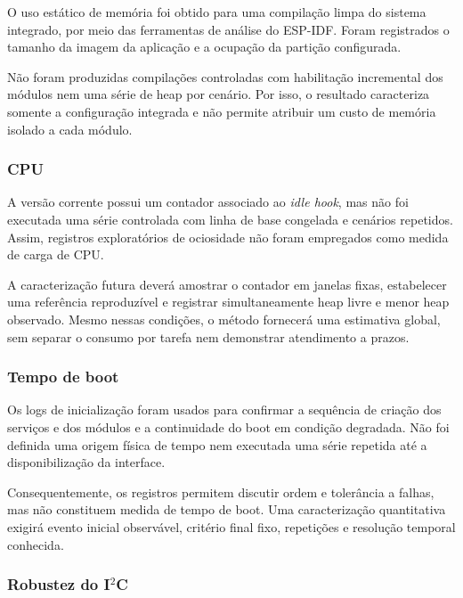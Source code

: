 \documentclass[a4paper,12pt]{article}
\begin{document}
O uso est\'atico de mem\'oria foi obtido para uma compila\c{c}\~ao limpa do sistema integrado, por meio das ferramentas de an\'alise do ESP-IDF. Foram registrados o tamanho da imagem da aplica\c{c}\~ao e a ocupa\c{c}\~ao da parti\c{c}\~ao configurada.


N\~ao foram produzidas compila\c{c}\~oes controladas com habilita\c{c}\~ao incremental dos m\'odulos nem uma s\'erie de heap por cen\'ario. Por isso, o resultado caracteriza somente a configura\c{c}\~ao integrada e n\~ao permite atribuir um custo de mem\'oria isolado a cada m\'odulo.


\subsubsection{CPU}

A vers\~ao corrente possui um contador associado ao \emph{idle hook}, mas n\~ao foi executada uma s\'erie controlada com linha de base congelada e cen\'arios repetidos. Assim, registros explorat\'orios de ociosidade n\~ao foram empregados como medida de carga de CPU.


A caracteriza\c{c}\~ao futura dever\'a amostrar o contador em janelas fixas, estabelecer uma refer\^encia reproduz\'ivel e registrar simultaneamente heap livre e menor heap observado. Mesmo nessas condi\c{c}\~oes, o m\'etodo fornecer\'a uma estimativa global, sem separar o consumo por tarefa nem demonstrar atendimento a prazos.


\subsubsection{Tempo de boot}


Os logs de inicializa\c{c}\~ao foram usados para confirmar a sequ\^encia de cria\c{c}\~ao dos servi\c{c}os e dos m\'odulos e a continuidade do boot em condi\c{c}\~ao degradada. N\~ao foi definida uma origem f\'isica de tempo nem executada uma s\'erie repetida at\'e a disponibiliza\c{c}\~ao da interface.


Consequentemente, os registros permitem discutir ordem e toler\^ancia a falhas, mas n\~ao constituem medida de tempo de boot. Uma caracteriza\c{c}\~ao quantitativa exigir\'a evento inicial observ\'avel, crit\'erio final fixo, repeti\c{c}\~oes e resolu\c{c}\~ao temporal conhecida.


\subsubsection{Robustez do I$^2$C}
\end{document}
